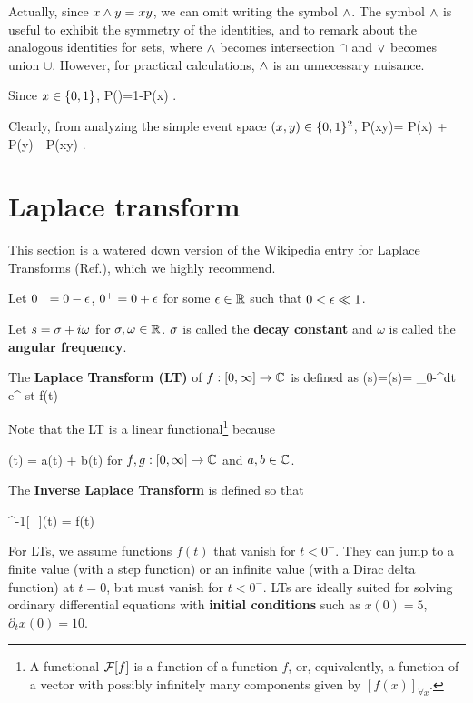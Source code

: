 Actually, since
$x\wedge y=xy$, we can omit writing
the symbol $\wedge$. The symbol
$\wedge$ is useful to
exhibit the symmetry
of the identities, and
to remark
about
the analogous identities
for sets, where
$\wedge$ becomes intersection $\cap$
and $\vee$ becomes union $\cup$. However,
for practical calculations,
$\wedge$ is an unnecessary nuisance.

Since $x\in \{0,1\}$,
\beq
P()=1-P(x)
\;.
\eeq

Clearly, from analyzing
the simple event space $(x,y)\in \{0,1\}^2$,
\beq
P(x\V y)= P(x) + P(y) - P(x\A y)
\;.
\eeq

\section{Laplace transform}
\label{sec-laplace-trans}

This section
is a watered down version
of the Wikipedia entry
for
Laplace Transforms
(Ref.\cite{wiki-laplace-transform}), which we highly recommend.

Let $0^- = 0-\epsilon$,
$0^+=0+\epsilon$
for some $\epsilon\in { \mathbb{R}}$
such that $0<\epsilon\ll 1$.

Let $s=\sigma + i\omega$
for $\sigma,\omega\in{ \mathbb{R}}$.
$\sigma$ is called
the {\bf decay
constant}
and $\omega$
is called the
{\bf angular frequency}.

The {\bf Laplace Transform (LT)} of $f:[0,\infty]\rightarrow { \mathbb{C}}$
is defined as
\beq
\call[f](s)=(s)=
\int_{0-}^\infty dt\; e^{-st} f(t)
\label{eq-def-lap-trans}
\eeq

Note that the LT is a linear functional\footnote{
A functional ${\cal F}[f]$ is a function
of a function $f$,
or,
equivalently,
a function
of a vector
with possibly
infinitely
many components
given by $[f(x)]_{\forall x}$.}
because

\beq
\call[af+bg](t)
=
a\call[f](t)
+
b\call[g](t)
\eeq
for $f,g:[0, \infty]\rightarrow { \mathbb{C}}$
and $a,b\in{ \mathbb{C}}$.

The {\bf Inverse
Laplace Transform}
is defined so that

\beq \call^{-1}[\underbrace{\call[f]}_{}](t)
= f(t)
\eeq

For LTs,
we assume functions
$f(t)$ that
vanish for $t<0^-$.
They can jump
to a finite value (with a step function) or
an infinite value
(with a Dirac delta function)
at $t=0$,
but must vanish for $t<0^-$.
LTs are ideally
suited for solving
ordinary
differential
equations
with {\bf initial conditions}
such as $x(0)=5$, $\partial_t x(0)=10$.




